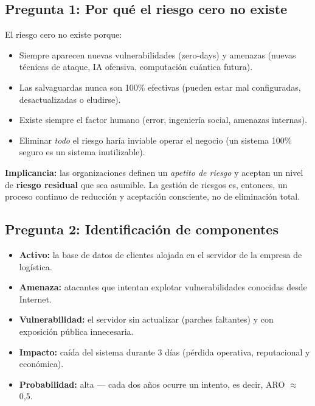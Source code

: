 \documentclass[11pt,a4paper]{article}
\begin{document}
\subsection*{Pregunta 1: Por qué el riesgo cero no existe}
\begin{respuesta}
El riesgo cero no existe porque:
\begin{itemize}[leftmargin=*]
  \item Siempre aparecen nuevas vulnerabilidades (zero-days) y amenazas (nuevas técnicas de ataque, IA ofensiva, computación cuántica futura).
  \item Las salvaguardas nunca son 100\% efectivas (pueden estar mal configuradas, desactualizadas o eludirse).
  \item Existe siempre el factor humano (error, ingeniería social, amenazas internas).
  \item Eliminar \textit{todo} el riesgo haría inviable operar el negocio (un sistema 100\% seguro es un sistema inutilizable).
\end{itemize}
\textbf{Implicancia:} las organizaciones definen un \textit{apetito de riesgo} y aceptan un nivel de \textbf{riesgo residual} que sea asumible. La gestión de riesgos es, entonces, un proceso continuo de reducción y aceptación consciente, no de eliminación total.
\end{respuesta}

\subsection*{Pregunta 2: Identificación de componentes}
\begin{respuesta}
\begin{itemize}[leftmargin=*]
  \item \textbf{Activo:} la base de datos de clientes alojada en el servidor de la empresa de logística.
  \item \textbf{Amenaza:} atacantes que intentan explotar vulnerabilidades conocidas desde Internet.
  \item \textbf{Vulnerabilidad:} el servidor sin actualizar (parches faltantes) y con exposición pública innecesaria.
  \item \textbf{Impacto:} caída del sistema durante 3 días (pérdida operativa, reputacional y económica).
  \item \textbf{Probabilidad:} alta --- cada dos años ocurre un intento, es decir, ARO $\approx$ 0,5.
\end{itemize}
\end{respuesta}
\end{document}

